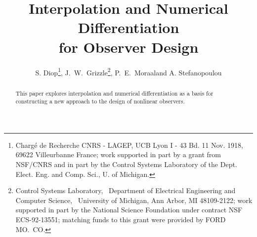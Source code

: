 \def\caption{\refstepcounter\@captype \@dblarg{\@caption\@captype}}


\long{}

\long{}

\makeatother



\small

\baselineskip=12pt
\parskip=0in


\title{\vspace*{.5cm}
\large\bf Interpolation and Numerical Differentiation \\
for Observer Design}

\author{S. Diop\thanks{Charg\'e de Recherche CNRS - LAGEP, UCB Lyon I - 43 Bd.
11 Nov. 1918, 69622 Villeurbanne France;
work supported in part by a grant from NSF/CNRS and in part 
by the Control Systems Laboratory of
the Dept. Elect. Eng. and Comp. Sci., U. of Michigan.}, 
J.\ W.\ Grizzle\thanks{Control Systems Laboratory, \
Department of Electrical Engineering and Computer
Science, \ University of Michigan, Ann Arbor, MI 48109-2122;
work supported in part by the National Science
Foundation under contract NSF ECS-92-13551; matching funds to this grant were
provided by FORD MO.\ CO.},
P.\ E.\ Moraal\footnotemark[2] and A. Stefanopoulou\footnotemark[2] }



\maketitle


\begin{abstract}

This paper explores interpolation and numerical differentiation
as a basis for constructing a new approach to the design of nonlinear
observers.  

\end{abstract}



